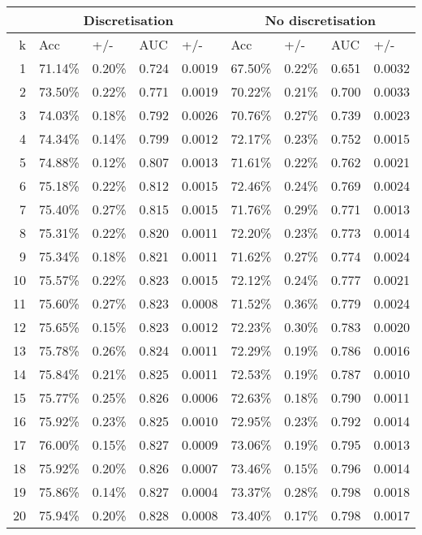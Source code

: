 \begin{table}[htbp]
\caption{}
\begin{tabular}{|r|r|r|r|r|r|r|r|r|}
\hline
\multicolumn{1}{|l|}{} & \multicolumn{ 4}{c|}{Discretisation} & \multicolumn{ 4}{c|}{No discretisation} \\ \hline
k & \multicolumn{1}{l|}{Acc} & \multicolumn{1}{l|}{+/-} & \multicolumn{1}{l|}{AUC} & \multicolumn{1}{l|}{+/-} & \multicolumn{1}{l|}{Acc} & \multicolumn{1}{l|}{+/-} & \multicolumn{1}{l|}{AUC} & \multicolumn{1}{l|}{+/-} \\ \hline
1 & 71.14\% & 0.20\% & 0.724 & 0.0019 & 67.50\% & 0.22\% & 0.651 & 0.0032 \\ \hline
2 & 73.50\% & 0.22\% & 0.771 & 0.0019 & 70.22\% & 0.21\% & 0.700 & 0.0033 \\ \hline
3 & 74.03\% & 0.18\% & 0.792 & 0.0026 & 70.76\% & 0.27\% & 0.739 & 0.0023 \\ \hline
4 & 74.34\% & 0.14\% & 0.799 & 0.0012 & 72.17\% & 0.23\% & 0.752 & 0.0015 \\ \hline
5 & 74.88\% & 0.12\% & 0.807 & 0.0013 & 71.61\% & 0.22\% & 0.762 & 0.0021 \\ \hline
6 & 75.18\% & 0.22\% & 0.812 & 0.0015 & 72.46\% & 0.24\% & 0.769 & 0.0024 \\ \hline
7 & 75.40\% & 0.27\% & 0.815 & 0.0015 & 71.76\% & 0.29\% & 0.771 & 0.0013 \\ \hline
8 & 75.31\% & 0.22\% & 0.820 & 0.0011 & 72.20\% & 0.23\% & 0.773 & 0.0014 \\ \hline
9 & 75.34\% & 0.18\% & 0.821 & 0.0011 & 71.62\% & 0.27\% & 0.774 & 0.0024 \\ \hline
10 & 75.57\% & 0.22\% & 0.823 & 0.0015 & 72.12\% & 0.24\% & 0.777 & 0.0021 \\ \hline
11 & 75.60\% & 0.27\% & 0.823 & 0.0008 & 71.52\% & 0.36\% & 0.779 & 0.0024 \\ \hline
12 & 75.65\% & 0.15\% & 0.823 & 0.0012 & 72.23\% & 0.30\% & 0.783 & 0.0020 \\ \hline
13 & 75.78\% & 0.26\% & 0.824 & 0.0011 & 72.29\% & 0.19\% & 0.786 & 0.0016 \\ \hline
14 & 75.84\% & 0.21\% & 0.825 & 0.0011 & 72.53\% & 0.19\% & 0.787 & 0.0010 \\ \hline
15 & 75.77\% & 0.25\% & 0.826 & 0.0006 & 72.63\% & 0.18\% & 0.790 & 0.0011 \\ \hline
16 & 75.92\% & 0.23\% & 0.825 & 0.0010 & 72.95\% & 0.23\% & 0.792 & 0.0014 \\ \hline
17 & 76.00\% & 0.15\% & 0.827 & 0.0009 & 73.06\% & 0.19\% & 0.795 & 0.0013 \\ \hline
18 & 75.92\% & 0.20\% & 0.826 & 0.0007 & 73.46\% & 0.15\% & 0.796 & 0.0014 \\ \hline
19 & 75.86\% & 0.14\% & 0.827 & 0.0004 & 73.37\% & 0.28\% & 0.798 & 0.0018 \\ \hline
20 & 75.94\% & 0.20\% & 0.828 & 0.0008 & 73.40\% & 0.17\% & 0.798 & 0.0017 \\ \hline
\end{tabular}
\label{}
\end{table}
